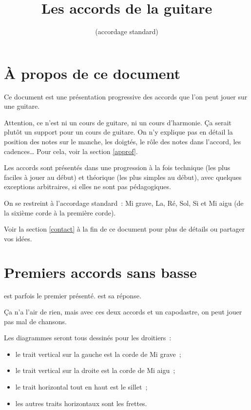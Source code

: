 \documentclass[11pt]{article}
\title{\vspace{-5em}Les accords de la guitare}
\author{(accordage standard)}
\date{}
\begin{document}
\maketitle

\setcounter{tocdepth}{2}
\tableofcontents

\section{À propos de ce document}

Ce document est une présentation progressive des accords que l’on peut jouer
sur une guitare.

Attention, ce n’est ni un cours de guitare, ni un cours d’harmonie.
Ça serait plutôt un support pour un cours de guitare. On n’y explique pas en
détail la position des notes sur le manche, les doigtés, le rôle des notes dans
l’accord, les cadences… Pour cela, voir la section \ref{approf}.

Les accords sont présentés dans une progression à la fois technique (les plus
faciles à jouer au début) et théorique (les plus simples au début), avec
quelques exceptions arbitraires, si elles ne sont pas pédagogiques.

On se restreint à l’accordage standard~: Mi grave, La, Ré, Sol, Si et Mi aigu
(de la sixième corde à la première corde).

Voir la section \ref{contact} à la fin de ce document pour plus de détails ou
partager vos idées.

\section{Premiers accords sans basse}

 est parfois le premier présenté.
\hspace{2em}
 est sa réponse.

Ça n’a l’air de rien, mais avec ces deux accords et un capodastre, on peut
jouer pas mal de chansons.

Les diagrammes seront tous dessinés pour les droitiers~:

\begin{itemize}
\item le trait vertical sur la gauche est la corde de Mi grave~;
\item le trait vertical sur la droite est la corde de Mi aigu~;
\item le trait horizontal tout en haut est le sillet~;
\item les autres traits horizontaux sont les frettes.
\end{itemize}
\end{document}
